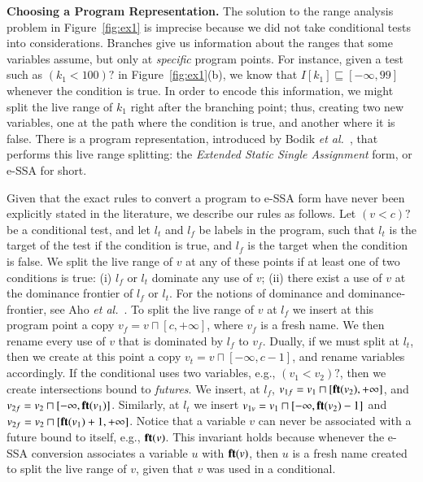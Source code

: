 \documentclass[preprint]{elsarticle}
\newcommand{\fun}[1]{\mbox{\textbf{#1}}}
\begin{document}
\noindent
\textbf{Choosing a Program Representation.}
The solution to the range analysis problem in Figure~\ref{fig:ex1}
is imprecise because we did not take conditional tests into considerations.
Branches give us information about the ranges that some variables assume, but
only at {\em specific} program points.
For instance, given a test such as $(k_1 < 100)?$ in  Figure~\ref{fig:ex1}(b),
we know that $I[k_1] \sqsubseteq [-\infty, 99]$ whenever the condition is true.
In order to encode this information, we might split the live range of $k_1$
right after the branching point; thus, creating two new variables, one at the
path where the condition is true, and another where it is false.
There is a program representation, introduced by Bodik
{\em et al.}~\cite{Bodik00}, that performs this live range splitting:
the {\em Extended Static Single Assignment} form, or e-SSA for short.

Given that the exact rules to convert a program to e-SSA form have never been
explicitly stated in the literature, we describe our rules as follows.
Let $(v < c)?$ be a conditional test, and let $l_t$ and $l_f$ be labels in
the program, such that $l_t$ is the target of the test if the condition is true,
and $l_f$ is the target when the condition is false.
We split the live range of $v$ at any of these points if at least one of two
conditions is true:
(i) $l_f$ or $l_t$ dominate any use of $v$;
(ii) there exist a use of $v$ at the dominance frontier of $l_f$ or $l_t$.
For the notions of dominance and dominance-frontier, see Aho
{\em et al.}~\cite[p.656]{Aho06}.
To split the live range of $v$ at $l_f$ we insert at this
program point a copy $v_f = v \sqcap [c, +\infty]$, where $v_f$ is a fresh name.
We then rename every use of $v$ that is dominated by $l_f$ to $v_f$.
Dually, if we must split at $l_t$, then we create at this point a copy
$v_t = v \sqcap [-\infty, c-1]$, and rename variables accordingly.
If the conditional uses two variables, e.g., $(v_1 < v_2)?$, then we create
intersections bound to {\em futures}.
We insert, at $l_f$, $v_{1f} = v_1 \sqcap [\fun{ft}(v_2), +\infty]$,
and $v_{2f} = v_2 \sqcap [-\infty, \fun{ft}(v_1)]$.
Similarly, at $l_t$ we insert
$v_{1v} = v_1 \sqcap [-\infty, \fun{ft}(v_2) - 1]$
and $v_{2f} = v_2 \sqcap [\fun{ft}(v_1) + 1, +\infty]$.
Notice that a variable $v$ can never be associated with a future bound to
itself, e.g., $\fun{ft}(v)$.
This invariant holds because whenever the e-SSA conversion associates a variable
$u$ with $\fun{ft}(v)$, then $u$ is a fresh name created to split the live range
of $v$, given that $v$ was used in a conditional.
\end{document}
